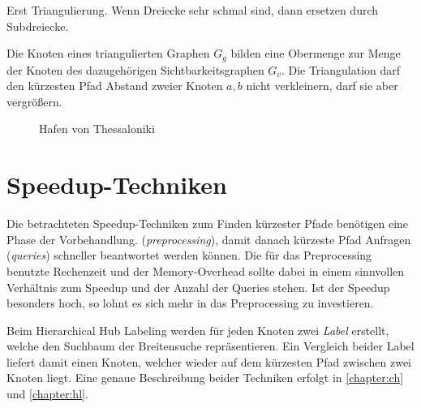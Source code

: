 
Erst Triangulierung. Wenn Dreiecke sehr schmal sind, dann ersetzen durch Subdreiecke.

Die Knoten eines triangulierten Graphen $G_g$ bilden eine Obermenge zur Menge der Knoten des dazugehörigen Sichtbarkeitsgraphen $G_v$.
Die Triangulation darf den kürzesten Pfad Abstand zweier Knoten $a, b$ nicht verkleinern, darf sie aber vergrößern.


\begin{figure}[ht]%
    \centering
    \caption{Hafen von Thessaloniki}%
    \label{fig:thessaloniki}%
\end{figure}

\section{Speedup-Techniken}

Die betrachteten Speedup-Techniken zum Finden kürzester Pfade benötigen eine Phase der Vorbehandlung. (\emph{preprocessing}), damit danach kürzeste Pfad Anfragen (\emph{queries}) schneller beantwortet werden können.
Die für das Preprocessing benutzte Rechenzeit und der Memory-Overhead sollte dabei in einem sinnvollen Verhältnis zum Speedup und der Anzahl der Queries stehen.
Ist der Speedup besonders hoch, so lohnt es sich mehr in das Preprocessing zu investieren.


Beim Hierarchical Hub Labeling werden für jeden Knoten zwei \emph{Label} erstellt, welche den Suchbaum der Breitensuche repräsentieren.
Ein Vergleich beider Label liefert damit einen Knoten, welcher wieder auf dem kürzesten Pfad zwischen zwei Knoten liegt.
Eine genaue Beschreibung beider Techniken erfolgt in \autoref{chapter:ch} und \autoref{chapter:hl}.





